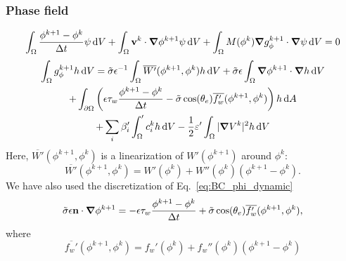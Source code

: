\documentclass[preprint,pre,superscriptaddress,a4paper]{revtex4-1}
\renewcommand{\v}[1]{\ensuremath{\mathbf{#1}}} %
\newcommand{\gv}[1]{\ensuremath{\mbox{\boldmath$ #1 $}}}
\newcommand{\diff}{\mathrm{d}}
\newcommand{\grad}[1]{\gv{\nabla} #1} %
\begin{document}
\subsubsection{Phase field}
\begin{equation}
  \int_\Omega \frac{\phi^{k+1}-\phi^k}{\Delta t} \psi \, \diff V + \int_\Omega \v v^k \cdot \grad \phi^{k+1} \psi \, \diff V + \int_\Omega M(\phi^k) \grad g_\phi^{k+1} \cdot \grad \psi \, \diff V %
  = 0
\end{equation}
\begin{multline}
  \int_\Omega g_\phi^{k+1} h \, \diff V = \tilde\sigma\epsilon^{-1} \int_\Omega \overline{W'}(\phi^{k+1}, \phi^{k}) h \, \diff V + \tilde\sigma\epsilon \int_\Omega \grad \phi^{k+1} \cdot \grad h \, \diff V \\
  + \int_{\partial \Omega}  \left( \epsilon \tau_w \frac{\phi^{k+1}-\phi^k}{\Delta t}  - \tilde\sigma\cos(\theta_e) \overline{f_w'}(\phi^{k+1}, \phi^{k}) \right) h \, \diff A \\
  + \sum_i \beta_i' \int_\Omega  ' c_i^k h \, \diff V - \frac 1 2 \varepsilon'  \int_\Omega | \grad V^k |^2 h \, \diff V
\end{multline}
Here, $\overline{W'}(\phi^{k+1}, \phi^{k})$ is a linearization of $W'(\phi^{k+1})$ around $\phi^k$:
\begin{equation}
  \overline{W'}(\phi^{k+1}, \phi^{k}) = W'(\phi^k) + W''(\phi^k) (\phi^{k+1}-\phi^k).
\end{equation}
We have also used the discretization of Eq.~\ref{eq:BC_phi_dynamic}
\begin{equation}
  \tilde\sigma\epsilon \v n \cdot \grad \phi^{k+1} = - \epsilon \tau_w \frac{\phi^{k+1}-\phi^k}{\Delta t}  + \tilde\sigma\cos(\theta_e) \overline{f_w'}(\phi^{k+1}, \phi^{k}),
\end{equation}
where
\begin{equation}
  \overline{f_w'}(\phi^{k+1}, \phi^{k}) = f_w'(\phi^k) + f_w''(\phi^k)(\phi^{k+1}-\phi^k)
\end{equation}
\end{document}
